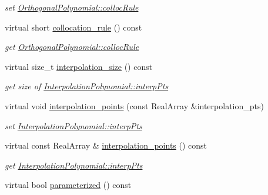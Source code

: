 \begin{DoxyCompactItemize}
\begin{DoxyCompactList}\small\item\em set \hyperlink{classPecos_1_1OrthogonalPolynomial_abcc1d84cc8e8c8b5a66f720067039f2e}{Orthogonal\+Polynomial\+::colloc\+Rule} \end{DoxyCompactList}\item 
virtual short \hyperlink{classPecos_1_1BasisPolynomial_a2e390f265fcc800348dc816d6cc37f86}{collocation\+\_\+rule} () const \label{classPecos_1_1BasisPolynomial_a2e390f265fcc800348dc816d6cc37f86}

\begin{DoxyCompactList}\small\item\em get \hyperlink{classPecos_1_1OrthogonalPolynomial_abcc1d84cc8e8c8b5a66f720067039f2e}{Orthogonal\+Polynomial\+::colloc\+Rule} \end{DoxyCompactList}\item 
virtual size\+\_\+t \hyperlink{classPecos_1_1BasisPolynomial_a3122d8fb10bc54de12fde87cffdf8fee}{interpolation\+\_\+size} () const 
\begin{DoxyCompactList}\small\item\em get size of \hyperlink{classPecos_1_1InterpolationPolynomial_ae944308ccb32a77df689397d462470b4}{Interpolation\+Polynomial\+::interp\+Pts} \end{DoxyCompactList}\item 
virtual void \hyperlink{classPecos_1_1BasisPolynomial_a7e9e8124500425e8435b9b0ffa0c2eb2}{interpolation\+\_\+points} (const Real\+Array \&interpolation\+\_\+pts)
\begin{DoxyCompactList}\small\item\em set \hyperlink{classPecos_1_1InterpolationPolynomial_ae944308ccb32a77df689397d462470b4}{Interpolation\+Polynomial\+::interp\+Pts} \end{DoxyCompactList}\item 
virtual const Real\+Array \& \hyperlink{classPecos_1_1BasisPolynomial_af8e63614c42281644c4c0e099fb3e1f8}{interpolation\+\_\+points} () const 
\begin{DoxyCompactList}\small\item\em get \hyperlink{classPecos_1_1InterpolationPolynomial_ae944308ccb32a77df689397d462470b4}{Interpolation\+Polynomial\+::interp\+Pts} \end{DoxyCompactList}\item 
virtual bool \hyperlink{classPecos_1_1BasisPolynomial_abc2afafc150f648667a41e0ce656b6da}{parameterized} () const \label{classPecos_1_1BasisPolynomial_abc2afafc150f648667a41e0ce656b6da}


\end{DoxyCompactItemize}

